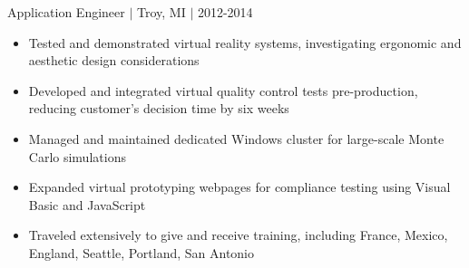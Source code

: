 \documentclass[11pt]{article}
\begin{document}
\hfill { Application Engineer $|$ Troy, MI $|$ 2012-2014}

\begin{itemize}
\item Tested and demonstrated virtual reality systems, investigating ergonomic and aesthetic design considerations 
\item Developed and integrated virtual quality control tests pre-production, reducing customer's decision time by six weeks
\item Managed and maintained dedicated Windows cluster for large-scale Monte Carlo simulations
\item Expanded virtual prototyping webpages for compliance testing using Visual Basic and JavaScript
\item Traveled extensively to give and receive training, including France, Mexico, England, Seattle, Portland, San Antonio 
\end{itemize}
\end{document}
